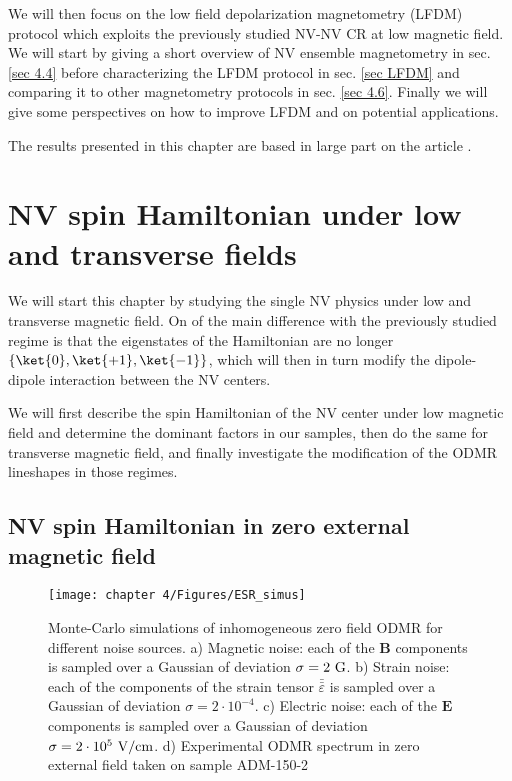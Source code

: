 \documentclass[a4paper, 11pt]{report}
\begin{document}
We will then focus on the low field depolarization magnetometry (LFDM) protocol which exploits the previously studied NV-NV CR at low magnetic field. We will start by giving a short overview of NV ensemble magnetometry in sec. \ref{sec 4.4} before characterizing the LFDM protocol in sec. \ref{sec LFDM} and comparing it to other magnetometry protocols in sec. \ref{sec 4.6}. Finally we will give some perspectives on how to improve LFDM and on potential applications.

The results presented in this chapter are based in large part on the article \citep{pellet2022spin}.

\section{NV spin Hamiltonian under low and transverse fields}
\label{sec 4.1}
We will start this chapter by studying the single NV physics under low and transverse magnetic field. On of the main difference with the previously studied regime is that the eigenstates of the Hamiltonian are no longer $\{ \ket{0}, \ket{+1}, \ket{-1} \}$, which will then in turn modify the dipole-dipole interaction between the NV centers.

We will first describe the spin Hamiltonian of the NV center under low magnetic field and determine the dominant factors in our samples, then do the same for transverse magnetic field, and finally investigate the modification of the ODMR lineshapes in those regimes.

\subsection{NV spin Hamiltonian in zero external magnetic field}
\label{sec. Hamltonian 0 B}
\begin{figure}[h]
\centering
\texttt{[image: chapter 4/Figures/ESR\_simus]}
\caption{Monte-Carlo simulations of inhomogeneous zero field ODMR for different noise sources. a) Magnetic noise: each of the $\mathbf{B}$ components is sampled over a Gaussian of deviation $\sigma=2\ \rm G$. b) Strain noise: each of the components of the strain tensor $\bar{\bar{\varepsilon}}$ is sampled over a Gaussian of deviation $\sigma=2\cdot 10^{-4}$. c) Electric noise: each of the $\mathbf{E}$ components is sampled over a Gaussian of deviation $\sigma=2\cdot 10^{5}\ \rm{V/cm}$. d) Experimental ODMR spectrum in zero external field taken on sample ADM-150-2}
\label{simus ESR}
\end{figure}
\end{document}
